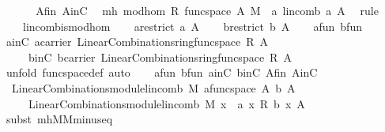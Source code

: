 \begin{isabellebody}
%
\isadelimproof
%
\endisadelimproof
%
\isatagproof
{}\isamarkupfalse%
\ {\isacharminus}\ \isanewline
\ \ \isamarkupfalse%
\ A{\isacharunderscore}fin\ AinC\ \isamarkupfalse%
\ mh{\isacharcolon}\ mod{\isacharunderscore}hom\ R\ {\isachardoublequoteopen}func{\isacharunderscore}space\ A{\isachardoublequoteclose}\ M\ \ {\isachardoublequoteopen}{\isacharparenleft}{\isasymlambda}a{\isachardot}\ lincomb\ a\ A{\isacharparenright}{\isachardoublequoteclose}\ \isamarkupfalse%
\ {\isacharparenleft}rule\ \isanewline
\ \ \ \ lincomb{\isacharunderscore}is{\isacharunderscore}mod{\isacharunderscore}hom{\isacharparenright}\isanewline
\ \ \isamarkupfalse%
\ {\isacharquery}a{\isacharequal}{\isachardoublequoteopen}restrict\ a\ A{\isachardoublequoteclose}\isanewline
\ \ \isamarkupfalse%
\ {\isacharquery}b{\isacharequal}{\isachardoublequoteopen}restrict\ b\ A{\isachardoublequoteclose}\isanewline
\ \ \isamarkupfalse%
\ a{\isacharunderscore}fun\ b{\isacharunderscore}fun\ \isamarkupfalse%
\ ainC{\isacharcolon}\ {\isachardoublequoteopen}{\isacharquery}a{\isasymin}carrier\ {\isacharparenleft}LinearCombinations{\isachardot}ring{\isachardot}func{\isacharunderscore}space\ R\ A{\isacharparenright}{\isachardoublequoteclose}\ \isanewline
\ \ \ \ \ binC{\isacharcolon}\ {\isachardoublequoteopen}{\isacharquery}b{\isasymin}carrier\ {\isacharparenleft}LinearCombinations{\isachardot}ring{\isachardot}func{\isacharunderscore}space\ R\ A{\isacharparenright}{\isachardoublequoteclose}\ \isamarkupfalse%
\ {\isacharparenleft}unfold\ func{\isacharunderscore}space{\isacharunderscore}def{\isacharcomma}\ auto{\isacharparenright}\isanewline
\ \ \isamarkupfalse%
\ a{\isacharunderscore}fun\ b{\isacharunderscore}fun\ ainC\ binC\ A{\isacharunderscore}fin\ AinC\isanewline
\ \ \isamarkupfalse%
\ {}{\isacharcolon}\ {\isachardoublequoteopen}LinearCombinations{\isachardot}module{\isachardot}lincomb\ M\ {\isacharparenleft}{\isacharquery}a{\isasymominus}\isactrlbsub {\isacharparenleft}func{\isacharunderscore}space\ A{\isacharparenright}\isactrlesub \ {\isacharquery}b{\isacharparenright}\ A\isanewline
\ \ \ \ {\isacharequal}\ LinearCombinations{\isachardot}module{\isachardot}lincomb\ M\ {\isacharparenleft}{\isasymlambda}x{\isachardot}\ \ a\ x\ {\isasymominus}\isactrlbsub R\isactrlesub \ b\ x{\isacharparenright}\ A{\isachardoublequoteclose}\isanewline
\ \ \ \ \isamarkupfalse%
\ {\isacharparenleft}subst\ mh{\isachardot}M{\isachardot}M{\isachardot}minus{\isacharunderscore}eq{\isacharparenright}\isanewline

\end{isabellebody}
